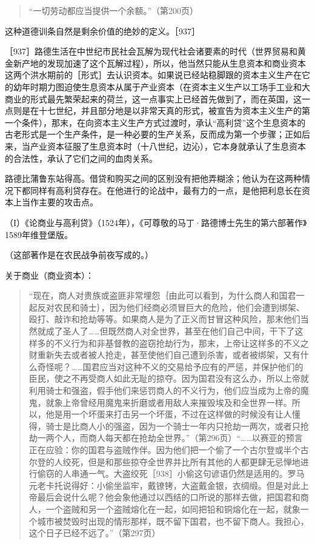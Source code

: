 \begin{quote}{“一切劳动都应当提供一个余额。”（第200页）}\end{quote}

这种道德训条自然是剩余价值的绝妙的定义。［937］


［937］路德生活在中世纪市民社会瓦解为现代社会诸要素的时代（世界贸易和黄金新产地的发现加速了这个瓦解过程），所以，他当然只能从生息资本和商业资本这两个洪水期前的［形式］去认识资本。如果说已经站稳脚跟的资本主义生产在它的幼年时期力图迫使生息资本从属于产业资本（在资本主义生产以工场手工业和大商业的形式最先繁荣起来的荷兰，这一点事实上已经首先做到了，而在英国，这一点则是在十七世纪，并且部分地是以非常天真的形式，被宣告为资本主义生产的第一个条件），那末，在向资本主义生产方式过渡时，承认“高利贷”这个生息资本的古老形式是一个生产条件，是一种必要的生产关系，反而成为第一个步骤；正如后来，当产业资本征服了生息资本时（十八世纪，边沁），它本身就承认了生息资本的合法性，承认了它们之间的血肉关系。

路德比蒲鲁东站得高。借贷和购买之间的区别没有把他弄糊涂；他认为在这两种情况下都同样有高利贷存在。在他进行的论战中，最有力的一点，是他把利息长在资本上当作主要的攻击点。

（I）《论商业与高利贷》（1524年），《可尊敬的马丁·路德博士先生的第六部著作》1589年维登堡版。

（这部著作是在农民战争前夜写成的。）

关于商业（商业资本）：

\begin{quote}{“现在，商人对贵族或盗匪非常埋怨｛由此可以看到，为什么商人和国君一起反对农民和骑士｝，因为他们经商必须冒巨大的危险，他们会遭到绑架、殴打、敲诈和抢劫等等。如果商人是为了正义而甘冒这种风险，那末他们当然就成了圣人了……但既然商人对全世界，甚至在他们自己中间，干下了这样多的不义行为和非基督教的盗窃抢劫行为，那末，上帝让这样多的不义之财重新失去或者被人抢走，甚至使他们自己遭到杀害，或者被绑架，又有什么奇怪呢？……国君应当对这种不义的交易给予应有的严惩，并保护他们的臣民，使之不再受商人如此无耻的掠夺。因为国君没有这么办，所以上帝就利用骑士和强盗，假手他们来惩罚商人的不义行为，他们应当成为上帝的魔鬼，就象上帝曾经用魔鬼来折磨或者用敌人来摧毁埃及和全世界一样。所以，他是用一个坏蛋来打击另一个坏蛋，不过在这样做的时候没有让人懂得，骑士是比商人小的强盗，因为一个骑士一年内只抢劫一两次，或者只抢劫一两个人，而商人每天都在抢劫全世界。”（第296页）“……以赛亚的预言正在应验：你的国君与盗贼作伴。因为他们把一个偷了一个古尔登或半个古尔登的人绞死，但是和那些掠夺全世界并比所有其他的人都更肆无忌惮地进行偷窃的人串通一气。大盗绞死［938］小偷这句谚语仍然是适用的。罗马元老卡托说得好：小偷坐监牢，戴镣铐，大盗戴金银，衣绸缎。但是对此上帝最后会说什么呢？他会象他通过以西结的口所说的那样去做，把国君和商人，一个盗贼和另一个盗贼熔化在一起，如同把铅和铜熔化在一起，就象一个城市被焚毁时出现的情形那样，既不留下国君，也不留下商人。我担心，这个日子已经不远了。”（第297页）}\end{quote}

